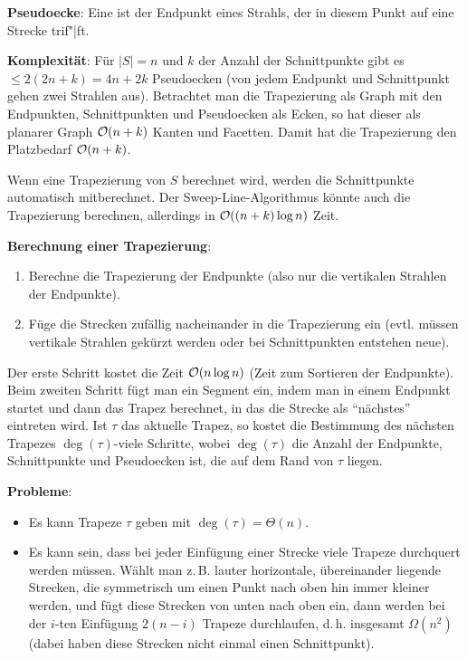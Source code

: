 \textbf{Pseudoecke}:
Eine  ist der Endpunkt eines Strahls,
der in diesem Punkt auf eine Strecke trif"|ft.

\textbf{Komplexität}:
Für $|S| = n$ und $k$ der Anzahl der Schnittpunkte gibt es $\le 2(2n + k) = 4n + 2k$ Pseudoecken
(von jedem Endpunkt und Schnittpunkt gehen zwei Strahlen aus).
Betrachtet man die Trapezierung als Graph mit den Endpunkten, Schnittpunkten und
Pseudoecken als Ecken, so hat dieser als planarer Graph $\mathcal{O}(n + k)$ Kanten und Facetten.
Damit hat die Trapezierung den Platzbedarf $\mathcal{O}(n + k)$.

\linie

Wenn eine Trapezierung von $S$ berechnet wird, werden die Schnittpunkte automatisch mitberechnet.
Der Sweep-Line-Algorithmus könnte auch die Trapezierung berechnen, allerdings in
$\mathcal{O}((n + k)\log n)$ Zeit.

\textbf{Berechnung einer Trapezierung}:
\begin{enumerate}
    \item
    Berechne die Trapezierung der Endpunkte
    (also nur die vertikalen Strahlen der Endpunkte).
    
    \item
    Füge die Strecken zufällig nacheinander in die Trapezierung ein
    (evtl. müssen vertikale Strahlen gekürzt werden oder bei Schnittpunkten
    entstehen neue).
\end{enumerate}
Der erste Schritt kostet die Zeit $\mathcal{O}(n \log n)$ (Zeit zum Sortieren der Endpunkte).
Beim zweiten Schritt fügt man ein Segment ein, indem man in einem Endpunkt startet und dann
das Trapez berechnet, in das die Strecke als "`nächstes"' eintreten wird.
Ist $\tau$ das aktuelle Trapez, so kostet die Bestimmung des nächsten Trapezes
$\deg(\tau)$-viele Schritte, wobei $\deg(\tau)$ die Anzahl der Endpunkte, Schnittpunkte und
Pseudoecken ist, die auf dem Rand von $\tau$ liegen.

\textbf{Probleme}:
\begin{itemize}
    \item
    Es kann Trapeze $\tau$ geben mit $\deg(\tau) = \Theta(n)$.
    
    \item
    Es kann sein, dass bei jeder Einfügung einer Strecke viele Trapeze durchquert werden müssen.
    Wählt man z.\,B. lauter horizontale, übereinander liegende Strecken, die symmetrisch um einen
    Punkt nach oben hin immer kleiner werden, und fügt diese Strecken von unten nach oben ein,
    dann werden bei der $i$-ten Einfügung $2(n - i)$ Trapeze durchlaufen, d.\,h.
    insgesamt $\Omega(n^2)$
    (dabei haben diese Strecken nicht einmal einen Schnittpunkt).
\end{itemize}

